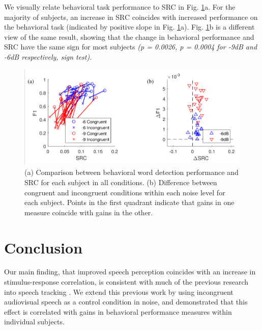 \documentclass[10pt,letterpaper]{article}
\begin{document}
  We visually relate behavioral task performance to SRC
  in Fig. \ref{srcVsBehavior}a. For the majority of subjects, an increase 
  in SRC coincides with increased performance on the behavioral task 
  (indicated by positive slope in Fig. \ref{srcVsBehavior}a). Fig. 
  \ref{srcVsBehavior}b is a different view of the same result, showing that
  the change in behavioral performance and SRC have the same sign for most 
  subjects \textit{(p = 0.0026, p = 0.0004 for -9dB and -6dB respectively, 
  sign test)}.

  \begin{figure}[]
    \begin{center}
      \includegraphics[scale=0.8]{Figure5ab}
    \end{center}
    \caption{(a) Comparison between behavioral word detection performance
    and SRC for each subject in all conditions. (b) Difference between
    congruent and incongruent conditions within each noise level for
    each subject. Points in the first quadrant indicate that gains in
    one measure coincide with gains in the other.}
    \label{srcVsBehavior}
  \end{figure}


\section{Conclusion}

  Our main finding, that improved speech perception coincides with an increase 
  in stimulus-response correlation, is consistent with much of the previous 
  research into speech tracking
  \cite{Ding2013,Peelle2013,Vanthornhout2017,Crosse2015}. 
  We extend this previous work by using incongruent audiovisual speech as a 
  control condition in noise, and demonstrated that this effect is correlated 
  with gains in behavioral performance measures within individual subjects.

\end{document}
